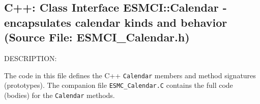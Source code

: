  
\setlength{\oldparskip}{\parskip}
\setlength{\parskip}{1.5ex}
\setlength{\oldparindent}{\parindent}
\setlength{\parindent}{0pt}
\setlength{\oldbaselineskip}{\baselineskip}
\setlength{\baselineskip}{11pt}
 
\def\bv{\begin{verbatim}}
\def\ev{\end{verbatim}}
\def\be{\begin{equation}}
\def\ee{\end{equation}}
\def\bea{\begin{eqnarray}}
\def\eea{\end{eqnarray}}
\def\bi{\begin{itemize}}
\def\ei{\end{itemize}}
\def\bn{\begin{enumerate}}
\def\en{\end{enumerate}}
\def\bd{\begin{description}}
\def\ed{\end{description}}
\def\({\left (}
\def\){\right )}
\def\[{\left [}
\def\]{\right ]}
\def\<{\left  \langle}
\def\>{\right \rangle}
\def\cI{{\cal I}}
\def\diag{\mathop{\rm diag}}
\def\tr{\mathop{\rm tr}}


 
\subsection{C++:  Class Interface ESMCI::Calendar - encapsulates calendar kinds and behavior (Source File: ESMCI\_Calendar.h)}


  
{\sf DESCRIPTION:\\ }


  
   The code in this file defines the C++ {\tt Calendar} members and method
   signatures (prototypes).  The companion file {\tt ESMC\_Calendar.C} contains
   the full code (bodies) for the {\tt Calendar} methods.
  
